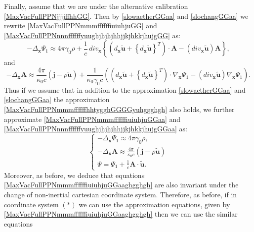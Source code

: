 \documentclass{article}
\theoremstyle{definition}
\theoremstyle{remark}
\renewcommand{\vec}[1]{\mathbf{#1}}
\newcommand{\er}{\eqref}
\newcommand{\er}{\eqref}
\begin{document}
Finally, assume that we are under the alternative calibration
\er{MaxVacFullPPNjjjjffhhGG}. Then by \er{slowaetherGGaa} and
\er{slochangGGaa} we rewrite \er{MaxVacFullPPNmmmffffffiuiuhjuGG}
and \er{MaxVacFullPPNnnnffffffyuughjhjhjhhjjkjhkkjhujgGG} as:
\begin{equation}\label{MaxVacFullPPNmmmffffffiuiuhjuGGaa}
-\Delta_{\vec x}\Psi_1\approx
4\pi\gamma_0\rho+\frac{1}{c}\,div_{\vec x} \left\{\left(d_{\vec
x}\vec {\tilde u}+\left\{d_{\vec x}\vec {\tilde
u}\right\}^T\right)\cdot\vec A-\left(div_{\vec x}\vec {\tilde
u}\right)\vec A\right\},
\end{equation}
and
\begin{equation}\label{MaxVacFullPPNnnnffffffyuughjhjhjhhjjkjhkkjhujgGGaa}
-\Delta_{\vec x}\vec A\approx \frac{4\pi}{\kappa_0 c}\left(\vec
j-\rho\vec {\tilde u}\right)+\frac{1}{\kappa_0\gamma_0
c}\left(\left(d_{\vec x}\vec {\tilde u}+\left\{d_{\vec x}\vec
{\tilde u}\right\}^T\right)\cdot \nabla_{\vec
x}\Psi_1-\left(div_{\vec x}\vec {\tilde u}\right)\nabla_{\vec
x}\Psi_1\right).
\end{equation}
Thus if we assume that in addition to the approximation
\er{slowaetherGGaa} and \er{slochangGGaa} the approximation
\er{MaxVacFullPPNmmmffffffhhtygghGGGGyuhggghgh} also holds, we
further approximate \er{MaxVacFullPPNmmmffffffiuiuhjuGGaa} and
\er{MaxVacFullPPNnnnffffffyuughjhjhjhhjjkjhkkjhujgGGaa} as:
\begin{equation}\label{MaxVacFullPPNmmmffffffiuiuhjuGGaaghgghgh}
\begin{cases}
-\Delta_{\vec x}\Psi_1\approx 4\pi\gamma_0\rho,
\\
-\Delta_{\vec x}\vec A\approx \frac{4\pi}{\kappa_0 c}\left(\vec
j-\rho\vec {\tilde u}\right)\\
\Psi=\Psi_1+\frac{1}{c}\vec A\cdot\vec {\tilde u}.
\end{cases}
\end{equation}
Moreover, as before, we deduce that equations
\er{MaxVacFullPPNmmmffffffiuiuhjuGGaaghgghgh} are also invariant
under the change of non-inertial cartesian coordinate system.
Therefore, as before, if in coordinate system $(*)$ we can use the
approximation equations, given by
\er{MaxVacFullPPNmmmffffffiuiuhjuGGaaghgghgh}
then we can use the similar equations
\end{document}
